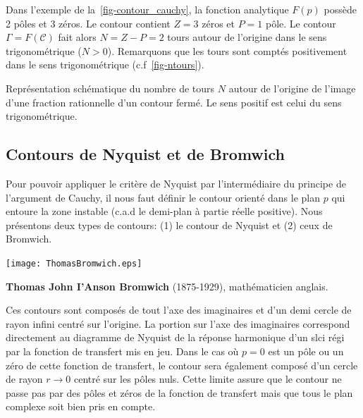 Dans l'exemple de la~\cref{fig-contour_cauchy}, la fonction analytique $F(p)$ 
possède 2 pôles et 3 zéros. Le contour contient $Z=3$ zéros et $P=1$ pôle.
Le contour $\Gamma=F(\mathcal{C})$ fait alors $N=Z-P=2$ tours autour 
de l'origine dans le sens trigonométrique ($N>0$). Remarquons que les tours 
sont comptés positivement dans le sens trigonométrique (c.f~\cref{fig-ntours}).
\begin{marginfigure}
    \centering
    
    
    \caption{Représentation schématique du nombre de tours $N$ autour de 
             l'origine de l'image d'une fraction rationnelle d'un contour 
             fermé. Le sens positif est celui du sens trigonométrique.
             \label{fig-ntours}}
\end{marginfigure}
\subsection{Contours de Nyquist et de Bromwich}
Pour pouvoir appliquer le critère de Nyquist par l'intermédiaire du principe 
de l'argument de Cauchy, il nous faut définir le contour orienté dans le plan 
$p$ qui entoure la zone instable (c.a.d le demi-plan à partie réelle positive).
Nous présentons deux types de contours: (1) le contour de Nyquist et (2) ceux 
de Bromwich.
\begin{marginfigure}
    \centering
    \texttt{[image: ThomasBromwich.eps]} 
    \caption*{\textbf{Thomas John I'Anson Bromwich} 
             (1875-1929), mathématicien anglais.}
\end{marginfigure}
Ces contours sont composés de tout l'axe des imaginaires et 
d'un demi cercle de rayon infini centré sur l'origine. La portion sur l'axe 
des imaginaires correspond directement au diagramme de Nyquist
de la réponse harmonique d'un \gls{slci} régi par la fonction de transfert mis 
en jeu. Dans le cas où $p=0$ est un pôle ou un zéro de cette fonction
de transfert, le contour sera également composé d'un cercle de rayon   
$r\rightarrow0$ centré sur les pôles nuls. Cette limite assure que le contour
ne passe pas par des pôles et zéros de la fonction de transfert mais que tous
le plan complexe soit bien pris en compte.
\clearpage
